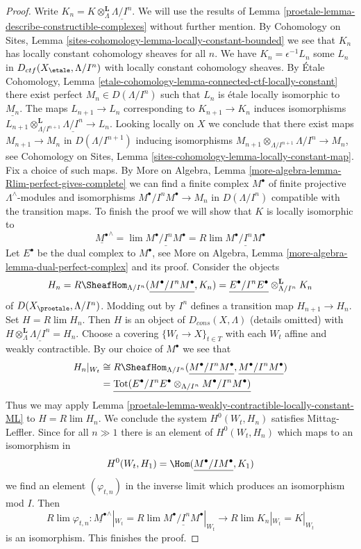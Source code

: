\begin{proof}
Write $K_n = K \otimes_\Lambda^\mathbf{L} \underline{\Lambda/I^n}$.
We will use the results of Lemma \ref{proetale-lemma-describe-constructible-complexes}
without further mention. By Cohomology on Sites, Lemma
\ref{sites-cohomology-lemma-locally-constant-bounded}
we see that $K_n$ has locally constant cohomology sheaves for all $n$.
We have $K_n = \epsilon^{-1}L_n$ some $L_n$ in
$D_{ctf}(X_\etale, \Lambda/I^n)$ with locally constant cohomology sheaves.
By \'Etale Cohomology, Lemma
\ref{etale-cohomology-lemma-connected-ctf-locally-constant}
there exist perfect $M_n \in D(\Lambda/I^n)$
such that $L_n$ is \'etale locally isomorphic to $\underline{M_n}$.
The maps $L_{n + 1} \to L_n$ corresponding to $K_{n + 1} \to K_n$
induces isomorphisms
$L_{n + 1} \otimes_{\Lambda/I^{n + 1}}^\mathbf{L} \underline{\Lambda/I^n}
\to L_n$. Looking locally on $X$ we conclude that there
exist maps $M_{n + 1} \to M_n$ in $D(\Lambda/I^{n + 1})$
inducing isomorphisms
$M_{n + 1} \otimes_{\Lambda/I^{n + 1}} \Lambda/I^n \to M_n$, see
Cohomology on Sites, Lemma \ref{sites-cohomology-lemma-locally-constant-map}.
Fix a choice of such maps. By
More on Algebra, Lemma \ref{more-algebra-lemma-Rlim-perfect-gives-complete}
we can find a finite complex $M^\bullet$ of finite projective
$\Lambda^\wedge$-modules and isomorphisms $M^\bullet/I^nM^\bullet \to M_n$
in $D(\Lambda/I^n)$ compatible with the transition maps.
To finish the proof we will show that $K$ is locally isomorphic
to
$$
\underline{M^\bullet}^\wedge =
\lim \underline{M^\bullet/I^nM^\bullet} =
R\lim \underline{M^\bullet/I^nM^\bullet}
$$
Let $E^\bullet$ be the dual complex to $M^\bullet$, see
More on Algebra, Lemma \ref{more-algebra-lemma-dual-perfect-complex}
and its proof. Consider the objects
$$
H_n =
R\SheafHom_{\Lambda/I^n}(\underline{M^\bullet/I^nM^\bullet}, K_n) =
\underline{E^\bullet/I^nE^\bullet} \otimes_{\Lambda/I^n}^\mathbf{L} K_n
$$
of $D(X_\proetale, \Lambda/I^n)$. Modding out by $I^n$ defines a
transition map $H_{n + 1} \to H_n$. Set $H = R\lim H_n$. Then $H$ is an
object of $D_{cons}(X, \Lambda)$ (details omitted) with
$H \otimes_\Lambda^\mathbf{L} \underline{\Lambda/I^n} = H_n$.
Choose a covering $\{W_t \to X\}_{t \in T}$ with each $W_t$
affine and weakly contractible. By our choice of $M^\bullet$
we see that
\begin{align*}
H_n|_{W_t} & \cong
R\SheafHom_{\Lambda/I^n}(\underline{M^\bullet/I^nM^\bullet},
\underline{M^\bullet/I^nM^\bullet}) \\
& =
\underline{
\text{Tot}(E^\bullet/I^nE^\bullet \otimes_{\Lambda/I^n} M^\bullet/I^nM^\bullet)
}
\end{align*}
Thus we may apply Lemma \ref{proetale-lemma-weakly-contractible-locally-constant-ML}
to $H = R\lim H_n$. We conclude the system $H^0(W_t, H_n)$ satisfies
Mittag-Leffler. Since for all $n \gg 1$ there is an element of $H^0(W_t, H_n)$
which maps to an isomorphism in
$$
H^0(W_t, H_1) = \Hom(\underline{M^\bullet/IM^\bullet}, K_1)
$$
we find an element $(\varphi_{t, n})$
in the inverse limit which produces an isomorphism mod $I$. Then
$$
R\lim \varphi_{t, n} :
\underline{M^\bullet}^\wedge|_{W_t} =
R\lim \underline{M^\bullet/I^nM^\bullet}|_{W_t}
\longrightarrow
R\lim K_n|_{W_t} = K|_{W_t}
$$
is an isomorphism. This finishes the proof.
\end{proof}

